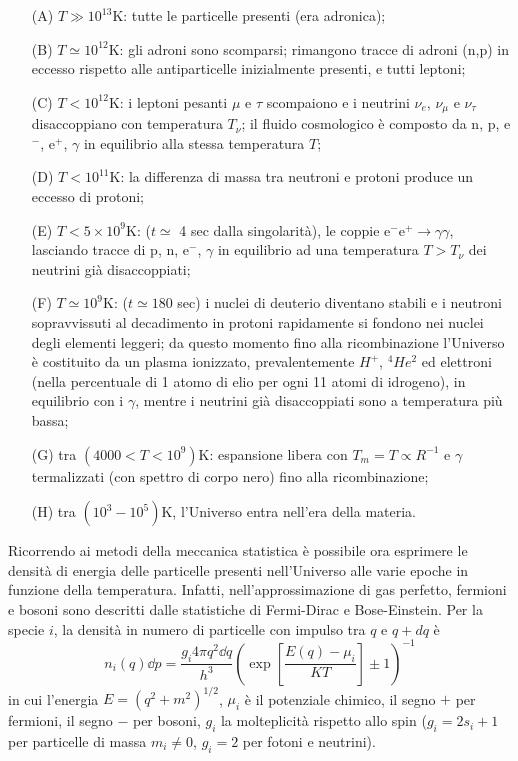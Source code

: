 \begin{itemize}
\item[(A)] $T \gg 10^{13}$K: tutte le particelle presenti (era adronica);
\item[(B)] $T \simeq 10^{12}$K: gli adroni sono scomparsi; rimangono tracce di
  adroni (n,p) in eccesso rispetto alle antiparticelle inizialmente presenti, e
  tutti leptoni;
\item[(C)] $T < 10^{12}$K: i leptoni pesanti $\mu$ e $\tau$ scompaiono e i
  neutrini $\nu_e$, $\nu_{\mu}$ e $\nu_{\tau}$ disaccoppiano con temperatura
  $T_{\nu}$; il fluido cosmologico è composto da n, p, e$^-$, e$^+$, $\gamma$ in
  equilibrio alla stessa temperatura $T$;
\item[(D)] $T < 10^{11}$K: la differenza di massa tra neutroni e protoni produce
  un eccesso di protoni;
\item[(E)] $T < 5 \times 10^{9}$K: ($t \simeq $ 4 sec dalla singolarità), le
  coppie $\text{e}^- \text{e}^+ \to \gamma \gamma$, lasciando tracce di p, n,
  e$^-$, $\gamma$ in equilibrio ad una temperatura $T > T_{\nu}$ dei neutrini
  già disaccoppiati;
\item[(F)] $T \simeq 10^{9}$K: ($t \simeq 180$ sec) i nuclei di deuterio
  diventano stabili e i neutroni sopravvissuti al decadimento in protoni
  rapidamente si fondono nei nuclei degli elementi leggeri; da questo momento
  fino alla ricombinazione l'Universo è costituito da un plasma ionizzato,
  prevalentemente $H^+$, $^4He^2$ ed elettroni (nella percentuale di 1 atomo di elio per
  ogni 11 atomi di idrogeno), in equilibrio con i $\gamma$, mentre i neutrini
  già disaccoppiati sono a temperatura più bassa;
\item[(G)] tra $(4000 < T < 10^{9})$K: espansione libera con $T_m = T \propto
  R^{-1}$ e $\gamma$ termalizzati (con spettro di corpo nero) fino alla
  ricombinazione;
\item[(H)] tra $(10^3 -10^5)$K, l'Universo entra nell'era della materia.
\end{itemize}

Ricorrendo ai metodi della meccanica statistica è possibile ora esprimere le
densità di energia delle particelle presenti nell'Universo alle varie epoche in
funzione della temperatura.  Infatti, nell'approssimazione di gas perfetto,
fermioni e bosoni sono descritti dalle statistiche di Fermi-Dirac e
Bose-Einstein. Per la specie $i$, la densità in numero di particelle con impulso
tra $q$ e $q+dq$ è
\begin{equation}
  n_i(q) \dd p = \frac{g_i 4 \pi q^2 \dd q} {h^3} \left( \exp\left[{
        {\frac{E(q)-\mu_i}{KT}} }\right] \pm 1 \right)^{-1}
\end{equation}
in cui l'energia $E =(q^2+m^2)^{1/2}$, $\mu_i$ è il potenziale chimico, il segno
$+$ per fermioni, il segno $-$ per bosoni, $g_i$ la molteplicità rispetto allo
spin ($g_i=2 s_i+1$ per particelle di massa $m_i \ne 0$, $g_i=2$ per fotoni e
neutrini).

